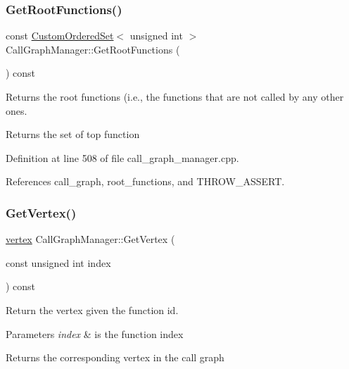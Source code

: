 \subsubsection{\texorpdfstring{Get\+Root\+Functions()}{GetRootFunctions()}}
{\footnotesize\ttfamily const \hyperlink{classCustomOrderedSet}{Custom\+Ordered\+Set}$<$ unsigned int $>$ Call\+Graph\+Manager\+::\+Get\+Root\+Functions (\begin{DoxyParamCaption}{ }\end{DoxyParamCaption}) const}



Returns the root functions (i.\+e., the functions that are not called by any other ones. 

\begin{DoxyReturn}{Returns}
the set of top function 
\end{DoxyReturn}


Definition at line 508 of file call\+\_\+graph\+\_\+manager.\+cpp.



References call\+\_\+graph, root\+\_\+functions, and T\+H\+R\+O\+W\+\_\+\+A\+S\+S\+E\+RT.

\mbox{\label{classCallGraphManager_a68c01aa6e40aff0aebec5ee0f503346b}} 
\subsubsection{\texorpdfstring{Get\+Vertex()}{GetVertex()}}
{\footnotesize\ttfamily \hyperlink{graph_8hpp_abefdcf0544e601805af44eca032cca14}{vertex} Call\+Graph\+Manager\+::\+Get\+Vertex (\begin{DoxyParamCaption}\item[{const unsigned int}]{index }\end{DoxyParamCaption}) const}



Return the vertex given the function id. 


\begin{DoxyParams}{Parameters}
{\em index} & is the function index \\
\hline
\end{DoxyParams}
\begin{DoxyReturn}{Returns}
the corresponding vertex in the call graph 
\end{DoxyReturn}


